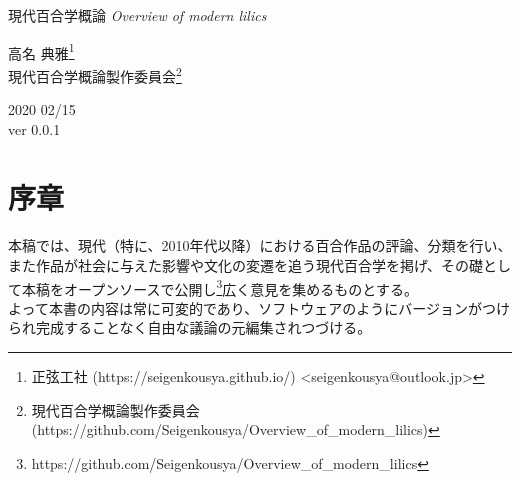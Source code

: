 \documentclass[ %
	uplatex,%
	a5paper,%
	papersize%
	]{jsbook}
\begin{document}
	
	\begin{titlepage}
		\pagecolor{black}
		\color{white}
		\renewcommand{\thefootnote}{\textcolor{red}{\fnsymbol{footnote}}}

		\begin{center}
			\vspace*{20mm}
			\fontsize{36pt}{0pt} \selectfont
			現代百合学概論
			\vspace*{5mm}
			\fontsize{21pt}{3pt} \selectfont
			{\sl Overview of modern lilics}
			\vspace{30mm}

			{\LARGE 高名 典雅\footnote[2]{\color{white}正弦工社 (https://seigenkousya.github.io/) <seigenkousya@outlook.jp>}}
			\vspace{2mm}\\
			\color{white}
			{\LARGE 現代百合学概論製作委員会\footnote[3]{\color{white}現代百合学概論製作委員会(https://github.com/Seigenkousya/Overview\_of\_modern\_lilics)}}
			\vspace{10mm}\\

			\begin{flushright}
				\color{white}
				{\rm \Large 2020 02/15}\vspace{2mm}\\
				{\rm \Large ver 0.0.1}
			\end{flushright}

			\vspace{10mm}
		\end{center}
	\end{titlepage}

	\pagecolor{white}
	\color{black}
	\frontmatter

	\chapter{序章}

	本稿では、現代（特に、2010年代以降）における百合作品の評論、分類を行い、また作品が社会に与えた影響や文化の変遷を追う現代百合学を掲げ、その礎として本稿をオープンソースで公開し\footnote{https://github.com/Seigenkousya/Overview\_of\_modern\_lilics}広く意見を集めるものとする。\\
	よって本書の内容は常に可変的であり、ソフトウェアのようにバージョンがつけられ完成することなく自由な議論の元編集されつづける。
\end{document}
